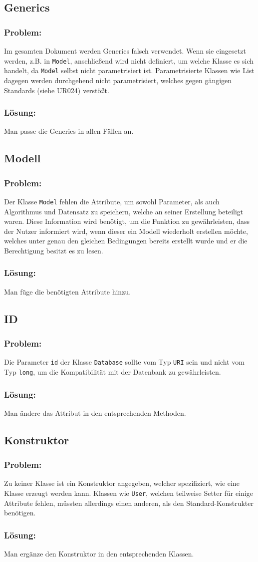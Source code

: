 \documentclass{article}
\newcommand{\RPS}[3]{\pagebreak[3]\subsection{#1}\subsubsection*{Problem:}#2\subsubsection*{Lösung:}#3\pagebreak[3]}
\begin{document}
\RPS{Generics}{%
	Im gesamten Dokument werden Generics falsch verwendet. Wenn sie eingesetzt werden, z.B. in \texttt{Model}, anschließend wird nicht definiert, um welche Klasse es sich handelt, da \texttt{Model} selbst nicht parametrisiert ist. Parametrisierte Klassen wie List dagegen werden durchgehend nicht parametrisiert, welches gegen gängigen Standards (siehe UR024) verstößt. 
}{%
Man passe die Generics in allen Fällen an.
}
\pagebreak
\RPS{Modell}{%
	Der Klasse \texttt{Model} fehlen die Attribute, um sowohl Parameter, als auch Algorithmus und Datensatz zu speichern, welche an seiner Erstellung beteiligt waren. Diese Information wird benötigt, um die Funktion zu gewährleisten, dass der Nutzer informiert wird, wenn dieser ein Modell wiederholt erstellen möchte, welches unter genau den gleichen Bedingungen bereits erstellt wurde und er die Berechtigung besitzt es zu lesen.
}{%
Man füge die benötigten Attribute hinzu.
}
\RPS{ID}{%
	Die Parameter \texttt{id} der Klasse \texttt{Database} sollte vom Typ \texttt{URI} sein und nicht vom Typ \texttt{long}, um die Kompatibilität mit der Datenbank zu gewährleisten.
}{%
Man ändere das Attribut in den entsprechenden Methoden.
}
\RPS{Konstruktor}{%
	Zu keiner Klasse ist ein Konstruktor angegeben, welcher spezifiziert, wie eine Klasse erzeugt werden kann. Klassen wie \texttt{User}, welchen teilweise Setter für einige Attribute fehlen, müssten allerdings einen anderen, als den Standard-Konstrukter benötigen.
}{%
Man ergänze den Konstruktor in den entsprechenden Klassen.
}
\end{document}
